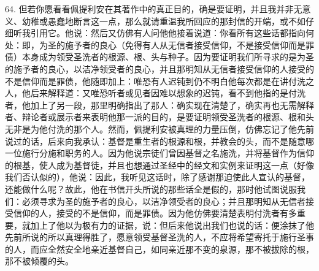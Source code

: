 64. 但若你愿看看佩提利安在其著作中的真正目的，确是要证明，并且我并非无意义、幼稚或愚蠢地断言这一点，那么就请重温我所回应的那封信的开端，或不如仔细听我引用它。他说：然后又仿佛有人问他他接着说道：你看所有这些话都指向何处：即，为圣的施予者的良心（免得有人从无信者接受信仰，不是接受信仰而是罪债）本身成为领受圣洗者的根源、根、头与种子。因为要证明我们所寻求的是为圣的施予者的良心，以洁净领受者的良心，并且那明知从无信者接受信仰的人接受的不是信仰而是罪债，他随即加上：唯恐有人迟钝到仍不明白他每次都是在讲付洗之人，他后来解释道：又唯恐听者或见者因难以想象的迟钝，看不到他指的是付洗者，他加上了另一段，那里明确指出了那人：确实现在清楚了，确实再也无需解释者、辩论者或展示者来表明他那一派的目的，是要证明领受圣洗者的根源、根和头无非是为他付洗的那个人。然而，佩提利安被真理的力量压倒，仿佛忘记了他先前说过的话，后来向我承认：基督是重生者的根源和根，并教会的头，而不是随意哪一位施行分施和职务的人。因为他说宗徒们曾因基督之名施洗，并将基督作为信仰的根基，使人成为基督徒，并且也想通过圣经中的经文和实例来证明这一点（好像我们否认似的），他说：因此，我听见这话时，除了感谢那迫使此人宣认的基督，还能做什么呢？故此，他在书信开头所说的那些话全是假的，那时他试图说服我们：必须寻求为圣的施予者的良心，以洁净领受者的良心；并且那明知从无信者接受信仰的人，接受的不是信仰，而是罪债。因为他仿佛要清楚表明付洗者有多重要，就加上了他以为极有力的证据，说：但后来他说出我们也说的话：便涂抹了他先前所说的所以真理得胜了，愿意领受基督圣洗的人，不应将希望寄托于施行圣事的人，而应全然安全地亲近基督自己，如同亲近那不变的泉源，那不被拔除的根，那不被倾覆的头。\par

